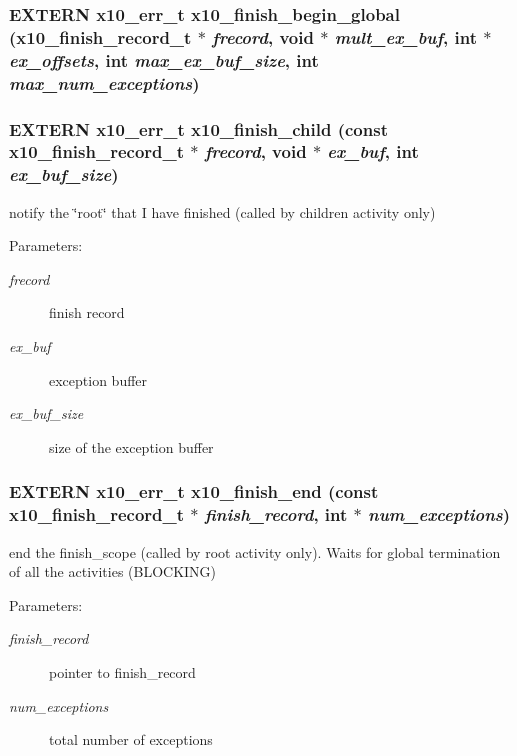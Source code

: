 \subsubsection{\setlength{\rightskip}{0pt plus 5cm}EXTERN {\bf x10\_\-err\_\-t} x10\_\-finish\_\-begin\_\-global ({\bf x10\_\-finish\_\-record\_\-t} $\ast$ {\em frecord}, void $\ast$ {\em mult\_\-ex\_\-buf}, int $\ast$ {\em ex\_\-offsets}, int {\em max\_\-ex\_\-buf\_\-size}, int {\em max\_\-num\_\-exceptions})}\label{x10_8h_a9}


\subsubsection{\setlength{\rightskip}{0pt plus 5cm}EXTERN {\bf x10\_\-err\_\-t} x10\_\-finish\_\-child (const {\bf x10\_\-finish\_\-record\_\-t} $\ast$ {\em frecord}, void $\ast$ {\em ex\_\-buf}, int {\em ex\_\-buf\_\-size})}\label{x10_8h_a11}


notify the \char`\"{}root\char`\"{} that I have finished (called by children activity only) 

\begin{Desc}
\item[Parameters:]
\begin{description}
\item[{\em frecord}]finish record \item[{\em ex\_\-buf}]exception buffer \item[{\em ex\_\-buf\_\-size}]size of the exception buffer \end{description}
\end{Desc}
\subsubsection{\setlength{\rightskip}{0pt plus 5cm}EXTERN {\bf x10\_\-err\_\-t} x10\_\-finish\_\-end (const {\bf x10\_\-finish\_\-record\_\-t} $\ast$ {\em finish\_\-record}, int $\ast$ {\em num\_\-exceptions})}\label{x10_8h_a10}


end the finish\_\-scope (called by root activity only). Waits for global termination of all the activities (BLOCKING) 

\begin{Desc}
\item[Parameters:]
\begin{description}
\item[{\em finish\_\-record}]pointer to finish\_\-record \item[{\em num\_\-exceptions}]total number of exceptions \end{description}
\end{Desc}
